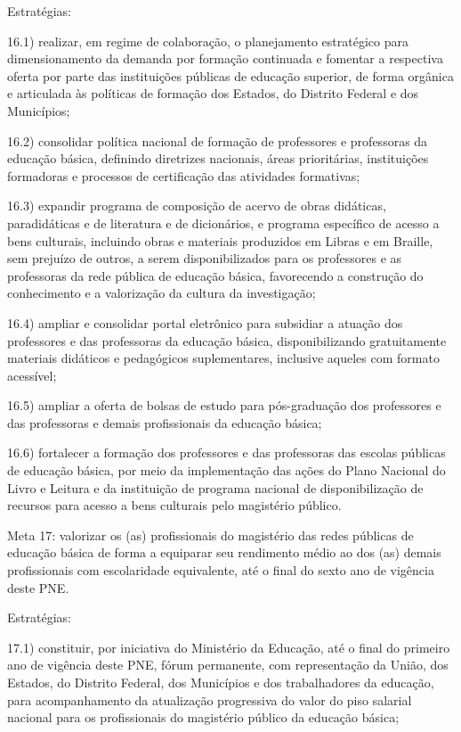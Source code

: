 \documentclass[
]{book}
\begin{document}
Estratégias:

16.1) realizar, em regime de colaboração, o planejamento estratégico para dimensionamento da demanda por formação continuada e fomentar a respectiva oferta por parte das instituições públicas de educação superior, de forma orgânica e articulada às políticas de formação dos Estados, do Distrito Federal e dos Municípios;

16.2) consolidar política nacional de formação de professores e professoras da educação básica, definindo diretrizes nacionais, áreas prioritárias, instituições formadoras e processos de certificação das atividades formativas;

16.3) expandir programa de composição de acervo de obras didáticas, paradidáticas e de literatura e de dicionários, e programa específico de acesso a bens culturais, incluindo obras e materiais produzidos em Libras e em Braille, sem prejuízo de outros, a serem disponibilizados para os professores e as professoras da rede pública de educação básica, favorecendo a construção do conhecimento e a valorização da cultura da investigação;

16.4) ampliar e consolidar portal eletrônico para subsidiar a atuação dos professores e das professoras da educação básica, disponibilizando gratuitamente materiais didáticos e pedagógicos suplementares, inclusive aqueles com formato acessível;

16.5) ampliar a oferta de bolsas de estudo para pós-graduação dos professores e das professoras e demais profissionais da educação básica;

16.6) fortalecer a formação dos professores e das professoras das escolas públicas de educação básica, por meio da implementação das ações do Plano Nacional do Livro e Leitura e da instituição de programa nacional de disponibilização de recursos para acesso a bens culturais pelo magistério público.

Meta 17: valorizar os (as) profissionais do magistério das redes públicas de educação básica de forma a equiparar seu rendimento médio ao dos (as) demais profissionais com escolaridade equivalente, até o final do sexto ano de vigência deste PNE.

Estratégias:

17.1) constituir, por iniciativa do Ministério da Educação, até o final do primeiro ano de vigência deste PNE, fórum permanente, com representação da União, dos Estados, do Distrito Federal, dos Municípios e dos trabalhadores da educação, para acompanhamento da atualização progressiva do valor do piso salarial nacional para os profissionais do magistério público da educação básica;
\end{document}

